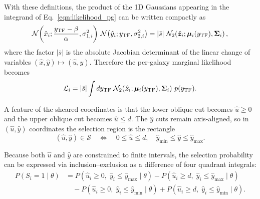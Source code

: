 With these definitions, the product of the 1D Gaussians appearing in the
integrand of Eq.~\ref{eqn:likelihood_pg} can be written compactly as
\begin{equation}
\mathcal N\!\left(\hat x_i;\frac{y_{\mathrm{TF}}-\beta}{\alpha},\sigma^2_{1,i}\right)\,
\mathcal N\!\left(\hat y_i;y_{\mathrm{TF}},\sigma^2_{2,i}\right)
=
|\bar s|\;
\mathcal N_2\!\left(\hat{\boldsymbol z}_i;\boldsymbol\mu_i(y_{\rm TF}),\boldsymbol\Sigma_i\right),
\end{equation}
where the factor $|\bar s|$ is the absolute Jacobian determinant of the linear
change of variables $(\hat x,\hat y)\mapsto(\hat u,\hat y)$.
Therefore the per-galaxy marginal likelihood becomes
\begin{equation}
\mathcal L_i
=
|\bar s|\int dy_{\mathrm{TF}}\;
\mathcal N_2\!\left(\hat{\boldsymbol z}_i;\boldsymbol\mu_i(y_{\rm TF}),\boldsymbol\Sigma_i\right)\,
p(y_{\mathrm{TF}}).
\end{equation}

A feature of the sheared coordinates is that the lower oblique cut becomes $\hat u\ge 0$ and the upper oblique cut becomes $\hat u\le d$.
The $\hat y$ cuts remain axis-aligned, so in $(\hat u,\hat y)$ coordinates the selection region is the rectangle
\begin{equation}
(\hat u,\hat y)\in\mathcal S
\quad \Longleftrightarrow \quad
0\le\hat u\le d,\quad
\hat y_{\min}\le \hat y \le \hat y_{\max}.
\end{equation}

Because both $\hat u$ and $\hat y$ are constrained to finite intervals, the
selection probability can be expressed via inclusion--exclusion as a
difference of four quadrant integrals:
\begin{equation}
\begin{aligned}
P(S_i=1 \mid \theta)
&=
P(\hat u_i\ge 0,\;\hat y_i\le \hat y_{\max}\mid \theta)
-
P(\hat u_i\ge d,\;\hat y_i\le \hat y_{\max}\mid \theta)\\
&\quad
-
P(\hat u_i\ge 0,\;\hat y_i\le \hat y_{\min}\mid \theta)
+
P(\hat u_i\ge d,\;\hat y_i\le \hat y_{\min}\mid \theta).
\end{aligned}
\end{equation}

